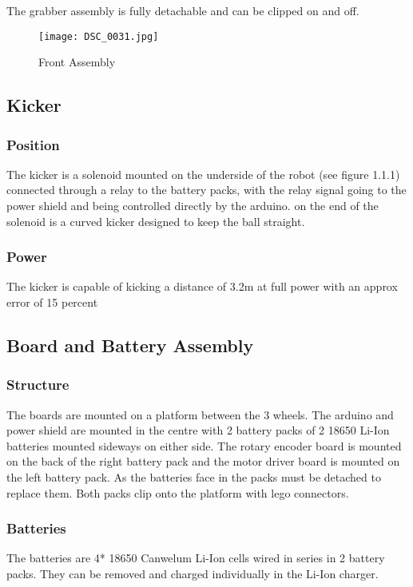 The grabber assembly is fully detachable and can be clipped on and off. 
\begin{figure}[!ht]
\caption{Front Assembly}
\centering
\texttt{[image: DSC\_0031.jpg]}
\end{figure}

\subsection{Kicker}
\subsubsection{Position}
The kicker is a solenoid mounted on the underside of the robot (see figure 1.1.1) connected through a relay to the battery packs, with the relay signal going to the power shield and being controlled directly by the arduino. on the end of the solenoid is a curved kicker designed to keep the ball straight.

\subsubsection{Power}
The kicker is capable of kicking a distance of 3.2m at full power with an approx error of 15 percent

\subsection{Board and Battery Assembly}
\subsubsection{Structure}
The boards are mounted on a platform between the 3 wheels. The arduino and power
shield are mounted in the centre with 2 battery packs of 2 18650 Li-Ion batteries mounted sideways on either
side. The rotary encoder board is
mounted on the back of the right battery pack and the motor driver board is mounted
on the left battery pack. As the batteries face in the packs must be detached to
replace them. Both packs clip onto the platform with lego connectors.

\subsubsection{Batteries}
The batteries are 4* 18650 Canwelum Li-Ion cells wired in series in 2 battery packs. They can be removed and charged individually in the Li-Ion charger.

